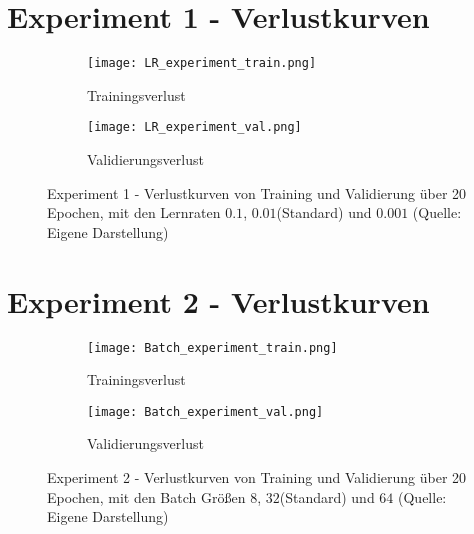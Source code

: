 
\chapter{Experiment 1 - Verlustkurven}
\label{appendix:Experiment1Verlustkurven}
\begin{figure}[ht]
	\centering
	\begin{subfigure}[b]{0.9\textwidth}
		\centering
		\texttt{[image: LR\_experiment\_train.png]}
		\caption{Trainingsverlust}
		\label{fig:ex1_lr_train}
	\end{subfigure}
	\vfil
	\begin{subfigure}[b]{0.9\linewidth}
		\centering
		\texttt{[image: LR\_experiment\_val.png]}
		\caption{Validierungsverlust}
		\label{fig:ex1_lr_val}
	\end{subfigure}
	\caption{Experiment 1 - Verlustkurven von Training und Validierung über 20 Epochen, mit den Lernraten $0.1$, $0.01$(Standard) und $0.001$ (Quelle: Eigene Darstellung)}
\end{figure} 

\chapter{Experiment 2 - Verlustkurven}
\label{appendix:Experiment2Verlustkurven}
\begin{figure}[ht]
	\centering
	\begin{subfigure}[b]{0.9\textwidth}
		\centering
		\texttt{[image: Batch\_experiment\_train.png]}
		\caption{Trainingsverlust}
		\label{fig:ex2_batch_train}
	\end{subfigure}
	\vfil
	\begin{subfigure}[b]{0.9\linewidth}
		\centering
		\texttt{[image: Batch\_experiment\_val.png]}
		\caption{Validierungsverlust}
		\label{fig:ex2_batch_val}
	\end{subfigure}
	\caption{Experiment 2 - Verlustkurven von Training und Validierung über 20 Epochen, mit den Batch Größen $8$, $32$(Standard) und $64$ (Quelle: Eigene Darstellung)}
\end{figure} 

